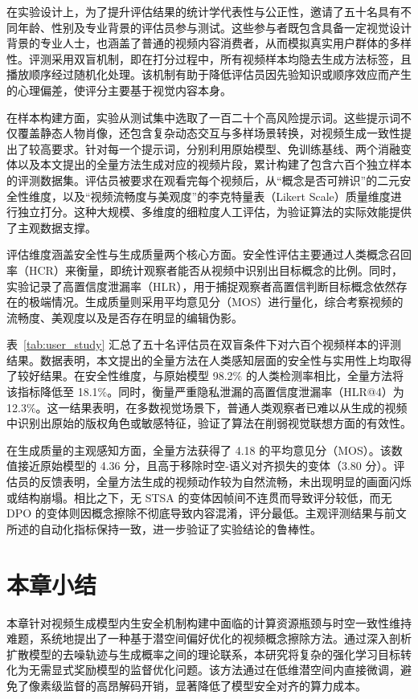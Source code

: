 在实验设计上，为了提升评估结果的统计学代表性与公正性，邀请了五十名具有不同年龄、性别及专业背景的评估员参与测试。这些参与者既包含具备一定视觉设计背景的专业人士，也涵盖了普通的视频内容消费者，从而模拟真实用户群体的多样性。评测采用双盲机制，即在打分过程中，所有视频样本均隐去生成方法标签，且播放顺序经过随机化处理。该机制有助于降低评估员因先验知识或顺序效应而产生的心理偏差，使评分主要基于视觉内容本身。

在样本构建方面，实验从测试集中选取了一百二十个高风险提示词。这些提示词不仅覆盖静态人物肖像，还包含复杂动态交互与多样场景转换，对视频生成一致性提出了较高要求。针对每一个提示词，分别利用原始模型、免训练基线、两个消融变体以及本文提出的全量方法生成对应的视频片段，累计构建了包含六百个独立样本的评测数据集。评估员被要求在观看完每个视频后，从“概念是否可辨识”的二元安全性维度，以及“视频流畅度与美观度”的李克特量表（Likert Scale）质量维度进行独立打分。这种大规模、多维度的细粒度人工评估，为验证算法的实际效能提供了主观数据支撑。


评估维度涵盖安全性与生成质量两个核心方面。安全性评估主要通过人类概念召回率（HCR）来衡量，即统计观察者能否从视频中识别出目标概念的比例。同时，实验记录了高置信度泄漏率（HLR），用于捕捉观察者高置信判断目标概念依然存在的极端情况。生成质量则采用平均意见分（MOS）进行量化，综合考察视频的流畅度、美观度以及是否存在明显的编辑伪影。

表~\ref{tab:user_study} 汇总了五十名评估员在双盲条件下对六百个视频样本的评测结果。数据表明，本文提出的全量方法在人类感知层面的安全性与实用性上均取得了较好结果。在安全性维度，与原始模型 98.2\% 的人类检测率相比，全量方法将该指标降低至 18.1\%。同时，衡量严重隐私泄漏的高置信度泄漏率（HLR@4）为 12.3\%。这一结果表明，在多数视觉场景下，普通人类观察者已难以从生成的视频中识别出原始的版权角色或敏感特征，验证了算法在削弱视觉联想方面的有效性。

在生成质量的主观感知方面，全量方法获得了 4.18 的平均意见分（MOS）。该数值接近原始模型的 4.36 分，且高于移除时空-语义对齐损失的变体（3.80 分）。评估员的反馈表明，全量方法生成的视频动作较为自然流畅，未出现明显的画面闪烁或结构崩塌。相比之下，无 STSA 的变体因帧间不连贯而导致评分较低，而无 DPO 的变体则因概念擦除不彻底导致内容混淆，评分最低。主观评测结果与前文所述的自动化指标保持一致，进一步验证了实验结论的鲁棒性。


\section{本章小结}\label{sec:summary4}

本章针对视频生成模型内生安全机制构建中面临的计算资源瓶颈与时空一致性维持难题，系统地提出了一种基于潜空间偏好优化的视频概念擦除方法。通过深入剖析扩散模型的去噪轨迹与生成概率之间的理论联系，本研究将复杂的强化学习目标转化为无需显式奖励模型的监督优化问题。该方法通过在低维潜空间内直接微调，避免了像素级监督的高昂解码开销，显著降低了模型安全对齐的算力成本。

